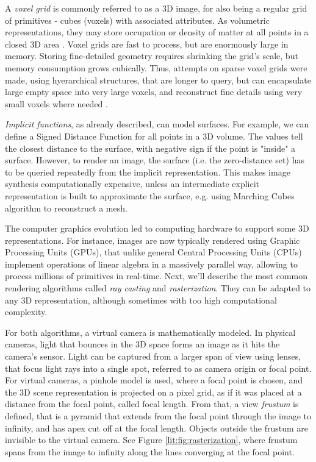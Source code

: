 A \textit{voxel grid} is commonly referred to as a 3D image, for also being a regular grid of primitives - cubes (voxels) with associated attributes. As volumetric representations, they may store occupation or density of matter at all points in a closed 3D area \cite{aux:voxels98}. Voxel grids are fast to process, but are enormously large in memory. Storing fine-detailed geometry requires shrinking the grid's scale, but memory consumption grows cubically. Thus, attempts on sparse voxel grids were made, using hyerarchical structures, that are longer to query, but can encapsulate large empty space into very large voxels, and reconstruct fine details using very small voxels where needed \cite{aux:voxels-sparse13}.

\textit{Implicit functions}, as already described, can model surfaces. For example, we can define a Signed Distance Function for all points in a 3D volume. The values tell the closest distance to the surface, with negative sign if the point is "inside" a surface. However, to render an image, the surface (i.e. the zero-distance set) has to be queried repeatedly from the implicit representation. This makes image synthesis computationally expensive, unless an intermediate explicit representation is built to approximate the surface, e.g. using Marching Cubes algorithm \cite{aux:marching-cubes87} to reconstruct a mesh.

The computer graphics evolution led to computing hardware to support some 3D representations. For instance, images are now typically rendered using Graphic Processing Units (GPUs), that unlike general Central Processing Units (CPUs) implement operations of linear algebra in a massively parallel way, allowing to process millions of primitives in real-time. Next, we'll describe the most common rendering algorithms called \textit{ray casting} and \textit{rasterization}. They can be adapted to any 3D representation, although sometimes with too high computational complexity.

For both algorithms, a virtual camera is mathematically modeled. In physical cameras, light that bounces in the 3D space forms an image as it hits the camera's sensor. Light can be captured from a larger span of view using lenses, that focus light rays into a single spot, referred to as camera origin or focal point. For virtual cameras, a pinhole model is used, where a focal point is chosen, and the 3D scene representation is projected on a pixel grid, as if it was placed at a distance from the focal point, called focal length. From that, a view \textit{frustum} is defined, that is a pyramid that extends from the focal point through the image to infinity, and has apex cut off at the focal length. Objects outside the frustum are invisible to the virtual camera. See Figure \ref{lit:fig:rasterization}, where frustum spans from the image to infinity along the lines converging at the focal point.

